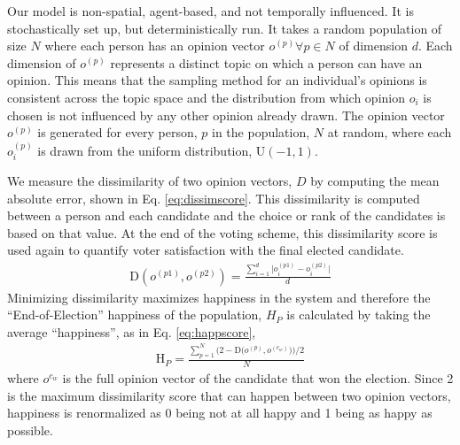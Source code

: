
Our model is non-spatial, agent-based, and not temporally influenced.
It is stochastically set up, but deterministically run.
It takes a random population of size $N$ where each person has an opinion vector $o^{(p)} \forall p \in N$ of dimension $d$.
Each dimension of $o^{(p)}$ represents a distinct topic on which a person can have an opinion.
This means that the sampling method for an individual's opinions is consistent across the topic space and the distribution from which opinion $o_i$ is chosen is not influenced by any other opinion already drawn.
The opinion vector $o^{(p)}$ is generated for every person, $p$ in the population, $N$ at random, where each $o^{(p)}_i$ is drawn from the uniform distribution, U$(-1,1)$.

We measure the dissimilarity of two opinion vectors, $D$ by computing the mean absolute error, shown in Eq. \ref{eq:dissimscore}.
This dissimilarity is computed between a person and each candidate and the choice or rank of the candidates is based on that value.
At the end of the voting scheme, this dissimilarity score is used again to quantify voter satisfaction with the final elected candidate.
\begin{align}
\text{D}(o^{(p1)},o^{(p2)}) = \frac{\sum_{i=1}^{d}\Big|o^{(p1)}_i - o^{(p2)}_i\Big|}{d}
\label{eq:dissimscore}
\end{align}
Minimizing dissimilarity maximizes happiness in the system and therefore the ``End-of-Election'' happiness of the population, $H_P$ is calculated by taking the average ``happiness'', as in Eq. \ref{eq:happscore},
\begin{align}
\text{H}_{P} =
\frac{\sum_{p=1}^{N} \Big(2 - \text{D} \big(o^{(p)},o^{(c_w)}\big)\Big) / 2 }{N}
\label{eq:happscore}
\end{align}
where $o^{c_w}$ is the full opinion vector of the candidate that won the election.
Since 2 is the maximum dissimilarity score that can happen between two opinion vectors, happiness is renormalized as 0 being not at all happy and 1 being as happy as possible.

